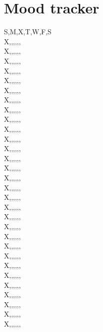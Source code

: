 \documentclass[a4paper]{article}
\begin{document}
\section{Mood tracker}
S,M,X,T,W,F,S\\
X,,,,,,\\
X,,,,,,\\
X,,,,,,\\
X,,,,,,\\
X,,,,,,\\
X,,,,,,\\
X,,,,,,\\
X,,,,,,\\
X,,,,,,\\
X,,,,,,\\
X,,,,,,\\
X,,,,,,\\
X,,,,,,\\
X,,,,,,\\
X,,,,,,\\
X,,,,,,\\
X,,,,,,\\
X,,,,,,\\
X,,,,,,\\
X,,,,,,\\
X,,,,,,\\
X,,,,,,\\
X,,,,,,\\
X,,,,,,\\
X,,,,,,\\
X,,,,,,\\
X,,,,,,\\
X,,,,,,\\
X,,,,,,\\
X,,,,,,\\
\newpage
\end{document}
